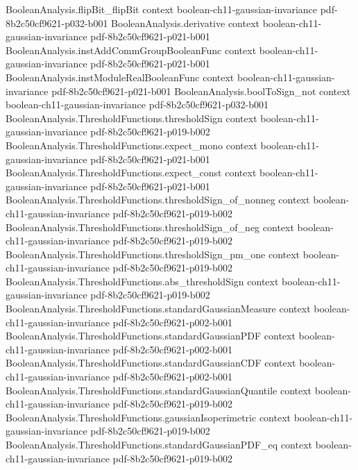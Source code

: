 \begin{theorem}
\proofstep
  {BooleanAnalysis.flipBit_flipBit}
  {context}
  {boolean-ch11-gaussian-invariance}
  {pdf-8b2c50cf9621-p032-b001}
\proofstep
  {BooleanAnalysis.derivative}
  {context}
  {boolean-ch11-gaussian-invariance}
  {pdf-8b2c50cf9621-p021-b001}
\proofstep
  {BooleanAnalysis.instAddCommGroupBooleanFunc}
  {context}
  {boolean-ch11-gaussian-invariance}
  {pdf-8b2c50cf9621-p021-b001}
\proofstep
  {BooleanAnalysis.instModuleRealBooleanFunc}
  {context}
  {boolean-ch11-gaussian-invariance}
  {pdf-8b2c50cf9621-p021-b001}
\proofstep
  {BooleanAnalysis.boolToSign_not}
  {context}
  {boolean-ch11-gaussian-invariance}
  {pdf-8b2c50cf9621-p032-b001}
\proofstep
  {BooleanAnalysis.ThresholdFunctions.thresholdSign}
  {context}
  {boolean-ch11-gaussian-invariance}
  {pdf-8b2c50cf9621-p019-b002}
\proofstep
  {BooleanAnalysis.ThresholdFunctions.expect_mono}
  {context}
  {boolean-ch11-gaussian-invariance}
  {pdf-8b2c50cf9621-p021-b001}
\proofstep
  {BooleanAnalysis.ThresholdFunctions.expect_const}
  {context}
  {boolean-ch11-gaussian-invariance}
  {pdf-8b2c50cf9621-p021-b001}
\proofstep
  {BooleanAnalysis.ThresholdFunctions.thresholdSign_of_nonneg}
  {context}
  {boolean-ch11-gaussian-invariance}
  {pdf-8b2c50cf9621-p019-b002}
\proofstep
  {BooleanAnalysis.ThresholdFunctions.thresholdSign_of_neg}
  {context}
  {boolean-ch11-gaussian-invariance}
  {pdf-8b2c50cf9621-p019-b002}
\proofstep
  {BooleanAnalysis.ThresholdFunctions.thresholdSign_pm_one}
  {context}
  {boolean-ch11-gaussian-invariance}
  {pdf-8b2c50cf9621-p019-b002}
\proofstep
  {BooleanAnalysis.ThresholdFunctions.abs_thresholdSign}
  {context}
  {boolean-ch11-gaussian-invariance}
  {pdf-8b2c50cf9621-p019-b002}
\proofstep
  {BooleanAnalysis.ThresholdFunctions.standardGaussianMeasure}
  {context}
  {boolean-ch11-gaussian-invariance}
  {pdf-8b2c50cf9621-p002-b001}
\proofstep
  {BooleanAnalysis.ThresholdFunctions.standardGaussianPDF}
  {context}
  {boolean-ch11-gaussian-invariance}
  {pdf-8b2c50cf9621-p002-b001}
\proofstep
  {BooleanAnalysis.ThresholdFunctions.standardGaussianCDF}
  {context}
  {boolean-ch11-gaussian-invariance}
  {pdf-8b2c50cf9621-p002-b001}
\proofstep
  {BooleanAnalysis.ThresholdFunctions.standardGaussianQuantile}
  {context}
  {boolean-ch11-gaussian-invariance}
  {pdf-8b2c50cf9621-p019-b002}
\proofstep
  {BooleanAnalysis.ThresholdFunctions.gaussianIsoperimetric}
  {context}
  {boolean-ch11-gaussian-invariance}
  {pdf-8b2c50cf9621-p019-b002}
\proofstep
  {BooleanAnalysis.ThresholdFunctions.standardGaussianPDF_eq}
  {context}
  {boolean-ch11-gaussian-invariance}
  {pdf-8b2c50cf9621-p019-b002}
\proofstep

\end{theorem}
